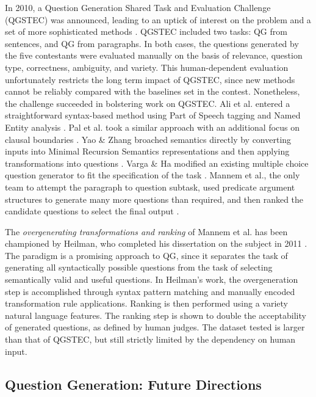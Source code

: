 In 2010, a Question Generation Shared Task and Evaluation Challenge (QGSTEC) was announced, leading to an uptick of interest on the problem and a set of more sophisticated methods \cite{rus2011question}. QGSTEC included two tasks: QG from sentences, and QG from paragraphs. In both cases, the questions generated by the five contestants were evaluated manually on the basis of relevance, question type, correctness, ambiguity, and variety. This human-dependent evaluation unfortunately restricts the long term impact of QGSTEC, since new methods cannot be reliably compared with the baselines set in the contest. Nonetheless, the challenge succeeded in bolstering work on QGSTEC. Ali et al. entered a straightforward syntax-based method using Part of Speech tagging and Named Entity analysis \cite{ali2010automatic}. Pal et al. took a similar approach with an additional focus on clausal boundaries \cite{pal2010qgstec}. Yao \& Zhang broached semantics directly by converting inputs into Minimal Recursion Semantics representations and then applying transformations into questions \cite{yao2010question}. Varga \& Ha modified an existing multiple choice question generator to fit the specification of the task \cite{vargaha}. Mannem et al., the only team to attempt the paragraph to question subtask, used predicate argument structures to generate many more questions than required, and then ranked the candidate questions to select the final output \cite{mannem2010question}. 

The \textit{overgenerating transformations and ranking} of Mannem et al. has been championed by Heilman, who completed his dissertation on the subject in 2011 \cite{heilman2010extracting, heilman2010good, heilman2011automatic}. The paradigm is a promising approach to QG, since it separates the task of generating all syntactically possible questions from the task of selecting semantically valid and useful questions. In Heilman's work, the overgeneration step is accomplished through syntax pattern matching and manually encoded transformation rule applications. Ranking is then performed using a variety natural language features. The ranking step is shown to double the acceptability of generated questions, as defined by human judges. The dataset tested is larger than that of QGSTEC, but still strictly limited by the dependency on human input.

\subsection{Question Generation: Future Directions}

